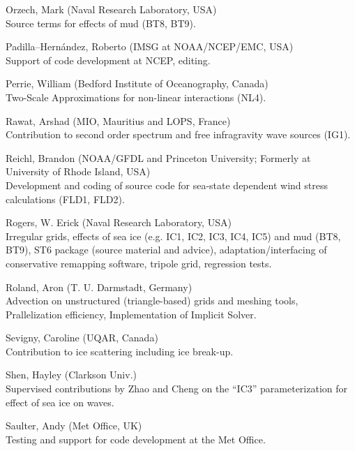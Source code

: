 \begin{list}{\ldots}{ }
\item [Orzech, Mark]  (Naval Research Laboratory, USA)\\ 
  Source terms for effects of mud (BT8, BT9).

\item [Padilla--Hern\'andez, Roberto]  (IMSG at NOAA/NCEP/EMC, USA)\\ 
  Support of code development at NCEP, editing.

\item [Perrie, William] (Bedford Institute of Oceanography, Canada)\\
 Two-Scale Approximations for non-linear interactions (NL4).

\item [Rawat, Arshad] (MIO, Mauritius and LOPS, France) \\
  Contribution to second order spectrum and free infragravity wave sources (IG1).    

\item [Reichl, Brandon] (NOAA/GFDL and Princeton University; Formerly at University of Rhode Island, USA) \\
  Development and coding of source code for sea-state dependent wind stress calculations (FLD1, FLD2).

\item [Rogers, W. Erick]  (Naval Research Laboratory, USA)\\ 
  Irregular grids, effects of sea ice (e.g. IC1, IC2, IC3, IC4, IC5) and mud (BT8, BT9), ST6 package (source material and advice), adaptation/interfacing of conservative remapping software, tripole grid, regression tests.

\item [Roland, Aron] (T. U. Darmstadt, Germany) \\
  Advection on unstructured (triangle-based) grids and meshing tools, Prallelization efficiency, Implementation of Implicit Solver.

\item [Sevigny, Caroline] (UQAR, Canada) \\
  Contribution to ice scattering including ice break-up.

\item [Shen, Hayley] (Clarkson Univ.) \\
  Supervised contributions by Zhao and Cheng on the ``IC3'' parameterization for effect of sea ice on waves.

\item [Saulter, Andy] (Met Office, UK)\\
Testing and support for code development at the Met Office.


\end{list}
